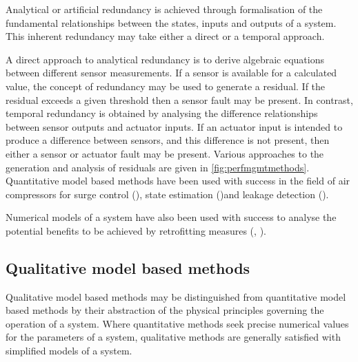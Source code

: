 Analytical or artificial redundancy is achieved through formalisation of the fundamental relationships between the states, inputs and outputs of a system. This inherent redundancy may take either a direct or a temporal approach.

A direct approach to analytical redundancy is to derive algebraic equations between different sensor measurements. If a sensor is available for a calculated value, the concept of redundancy may be used to generate a residual. If the residual exceeds a given threshold then a sensor fault may be present. In contrast, temporal redundancy is obtained by analysing the difference relationships between sensor outputs and actuator inputs. If an actuator input is intended to produce a difference between sensors, and this difference is not present, then either a sensor or actuator fault may be present. Various approaches to the generation and analysis of residuals are given in \autoref{fig:perfmgmtmethods}. Quantitative model based methods have been used with success in the field of air compressors for surge control (\cite{Backi2013}), state estimation (\cite{Nair2011})and leakage detection (\cite{Krichel2011}).

Numerical models of a system have also been used with success to analyse the potential benefits to be achieved by retrofitting measures (\cite{Murray2012}, \cite{Murray2014}).


\subsection{Qualitative model based methods}
\label{subsec:qualimodel}
Qualitative model based methods may be distinguished from quantitative model based methods by their abstraction of the physical principles governing the operation of a system. Where quantitative methods seek precise numerical values for the parameters of a system, qualitative methods are generally satisfied with simplified models of a system.


